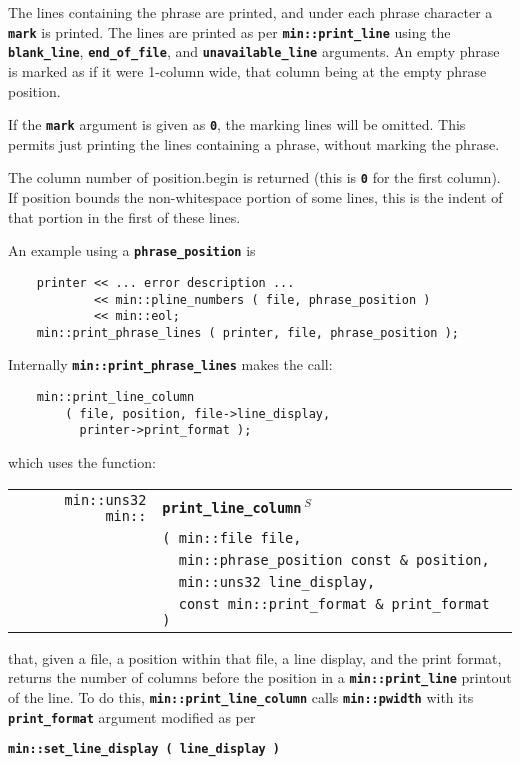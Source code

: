 \documentclass[12pt]{article}
\makeatletter
\newcommand{\TT}[1]{{\tt \bfseries #1}}
\newcommand{\ttindex}[1]{\index{#1@{\tt #1}}}
\newcommand{\EOL}{\penalty \exhyphenpenalty}
\newenvironment{indpar}[1][0.3in]%
	{\begin{list}{}%
		     {\setlength{\itemsep}{0in}%
		      \setlength{\topsep}{0in}%
		      \setlength{\parsep}{1ex}%
		      \setlength{\labelwidth}{#1}%
		      \setlength{\leftmargin}{#1}%
		      \addtolength{\leftmargin}{\labelsep}}%
	 \item}%
	{\end{list}}
\newcommand{\LABEL}[1]{\label{#1}}
\newlength{\ARGBREAKLENGTH}
\newcommand{\ARGBREAK}[1][\ARGBREAKLENGTH]{\\&\hspace*{#1}}
\newcommand{\MINKEY}[1]%
	   {\TT{#1}\ttindex{min::#1}\ttindex{#1}}
\newcommand{\RESIZE}{$\,^S$}
\makeatother
\begin{document}
The lines containing the phrase are printed, and under each phrase
character a \TT{mark} is printed.  The lines are printed
as per \TT{min::\EOL print\_\EOL line} using the
\TT{blank\_\EOL line},
\TT{end\_\EOL of\_\EOL file}, and
\TT{unavailable\_\EOL line} arguments.
An empty phrase is marked as if it were 1-column wide, that column
being at the empty phrase position.

If the \TT{mark} argument is given as \TT{0}, the marking lines
will be omitted.  This permits just printing the lines containing
a phrase, without marking the phrase.

The column number of position.begin is returned (this is \TT{0}
for the first column).  If position bounds the non-whitespace
portion of some lines, this is the indent of that portion in
the first of these lines.

An example using a \TT{phrase\_position} is

\begin{indpar}\begin{verbatim}
    printer << ... error description ...
            << min::pline_numbers ( file, phrase_position )
            << min::eol;
    min::print_phrase_lines ( printer, file, phrase_position );
\end{verbatim}\end{indpar}

Internally \TT{min::\EOL print\_\EOL phrase\_\EOL lines}
makes the call:

\begin{indpar}\begin{verbatim}
    min::print_line_column
        ( file, position, file->line_display,
          printer->print_format );
\end{verbatim}\end{indpar}

which uses the function:

\begin{indpar}[1em]\begin{tabular}{r@{}l}
\verb|min::uns32 min::|
    & \MINKEY{print\_\EOL line\_\EOL column\RESIZE}\ARGBREAK
      \verb|( min::file file,|\ARGBREAK
      \verb|  min::phrase_position const & position,|\ARGBREAK
      \verb|  min::uns32 line_display,|\ARGBREAK
      \verb|  const min::print_format & print_format )|
\LABEL{MIN::PRINT_LINE_COLUMN} \\
\end{tabular}\end{indpar}

that, given a file, a position within that file, a line display,
and the print format, returns the number of
columns before the position in a \TT{min::\EOL print\_\EOL line}
printout of the line.  To do this, \TT{min::\EOL print\_\EOL line\_\EOL column}
calls \TT{min::\EOL pwidth} with its \TT{print\_\EOL format} argument modified
as per
\begin{center}
\TT{min::set\_line\_display ( line\_display )}
\end{center}
\end{document}
